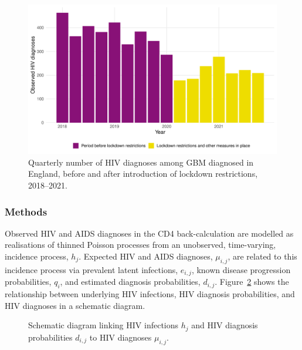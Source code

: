 \begin{figure}[htbp!]
  \centering
  \includegraphics[width=\textwidth]{lockdown_diagnoses.pdf}
  \caption[Quarterly number of HIV diagnoses among GBM diagnosed in England, before and after introduction of lockdown restrictions, 2018--2021]{Quarterly number of HIV diagnoses among GBM diagnosed in England, before and after introduction of lockdown restrictions, 2018--2021.}\label{fig:lockdown_diagnoses}
\end{figure}

\subsubsection{Methods}

Observed HIV and AIDS diagnoses in the CD4 back-calculation are modelled as realisations of thinned Poisson processes from an unobserved, time-varying, incidence process, $h_j$. Expected HIV and AIDS diagnoses, $\mu_{i,j}$, are related to this incidence process via prevalent latent infections, $e_{i,j}$, known disease progression probabilities, $q_i$, and estimated diagnosis probabilities, $d_{i,j}$. Figure~\ref{fig:counterfactdag} shows the relationship between underlying HIV infections, HIV diagnosis probabilities, and HIV diagnoses in a schematic diagram.

\begin{figure}[htbp!]
  \centering
  \caption[Schematic diagram linking HIV infections and HIV diagnosis probabilities to HIV diagnoses]{Schematic diagram linking HIV infections $h_j$ and HIV diagnosis probabilities $d_{i,j}$ to HIV diagnoses $\mu_{i,j}$.}\label{fig:counterfactdag}
\end{figure}

